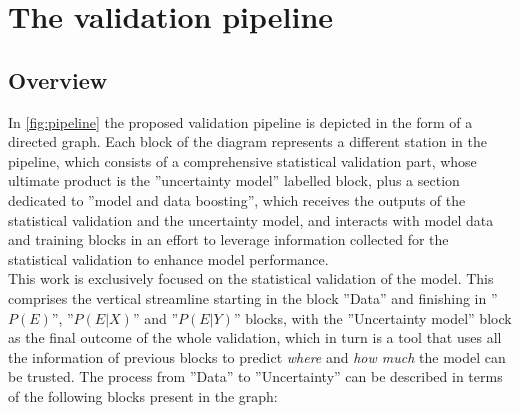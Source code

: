 \chapter{The validation pipeline}\label{chap:3}
%
\label{chap:Chap_1}

\section{Overview}
\indent In \autoref{fig:pipeline} the proposed validation pipeline is depicted in the form of a directed graph. Each block of the diagram represents a different station in the pipeline, which consists of a comprehensive statistical validation part, whose ultimate product is the ''uncertainty model'' labelled block, plus a section dedicated to ''model and data boosting'', which receives the outputs of the statistical validation and the uncertainty model, and interacts with model data and training blocks in an effort to leverage information collected for the statistical validation to enhance model performance.\\
%
\indent This work is exclusively focused on the statistical validation of the model. This comprises the vertical streamline starting in the block ''Data'' and finishing in ''$P(E)$'', ''$P(E|X)$'' and ''$P(E|Y)$'' blocks, with the ''Uncertainty model'' block as the final outcome of the whole validation, which in turn is a tool that uses all the information of previous blocks to predict \textit{where} and \textit{how much} the model can be trusted. The process from ''Data'' to ''Uncertainty'' can be described in terms of the following blocks present in the graph:
